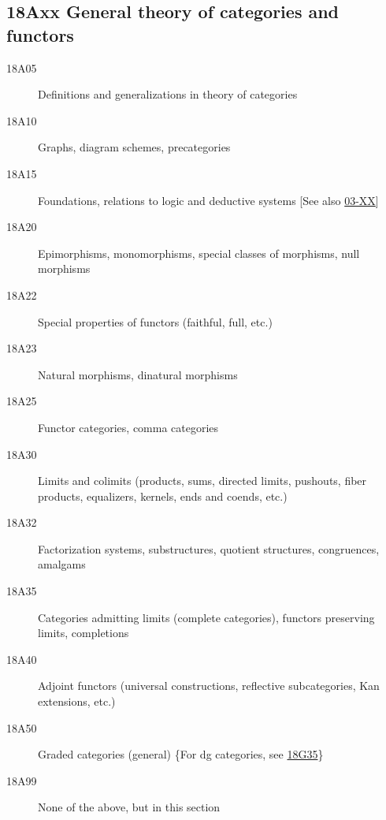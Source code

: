 \subsection*{18Axx  General theory of categories and functors }\label{18Axx}
\begin{description} 
\item [18A05]\label{18A05} Definitions and generalizations in theory of categories
\item [18A10]\label{18A10} Graphs, diagram schemes, precategories
\item [18A15]\label{18A15} Foundations, relations to logic and deductive systems [See also \hyperref[03-XX]{03-XX}]
\item [18A20]\label{18A20} Epimorphisms, monomorphisms, special classes of morphisms, null morphisms
\item [18A22]\label{18A22} Special properties of functors (faithful, full, etc.)
\item [18A23]\label{18A23} Natural morphisms, dinatural morphisms
\item [18A25]\label{18A25} Functor categories, comma categories
\item [18A30]\label{18A30} Limits and colimits (products, sums, directed limits, pushouts, fiber products, equalizers, kernels, ends and coends, etc.)
\item [18A32]\label{18A32} Factorization systems, substructures, quotient structures, congruences, amalgams
\item [18A35]\label{18A35} Categories admitting limits (complete categories), functors preserving limits, completions
\item [18A40]\label{18A40} Adjoint functors (universal constructions, reflective subcategories, Kan extensions, etc.)
\item [18A50]\label{18A50} Graded categories (general) \{For dg categories, see \hyperref[18G35]{18G35}\}
\item [18A99]\label{18A99} None of the above, but in this section
\end{description}
